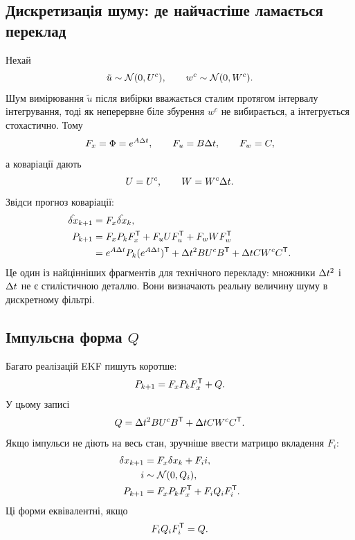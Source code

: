 \subsection{Дискретизація шуму: де найчастіше ламається переклад}

Нехай
\begin{equation}
 \tilde u \sim \mathcal{N}(0,U^c), \qquad w^c\sim\mathcal{N}(0,W^c).
\end{equation}
Шум вимірювання $\tilde u$ після вибірки вважається сталим протягом інтервалу інтегрування, тоді як неперервне біле збурення $w^c$ не вибирається, а інтегрується стохастично. Тому
\begin{equation}
 F_x = \Phi = e^{A\Delta t}, \qquad F_u = B\Delta t, \qquad F_w=C,
\end{equation}
а коваріації дають
\begin{equation}
 U = U^c, \qquad W=W^c\Delta t.
\end{equation}
Звідси прогноз коваріації:
\begin{align}
 \hat{\delta x}_{k+1} &= F_x\hat{\delta x}_{k},\\
 P_{k+1} &= F_xP_kF_x^{\mathsf T} + F_uUF_u^{\mathsf T} + F_wWF_w^{\mathsf T} \\
 &= e^{A\Delta t}P_k(e^{A\Delta t})^{\mathsf T} + \Delta t^2BU^cB^{\mathsf T} + \Delta t CW^cC^{\mathsf T}.
\end{align}
Це один із найцінніших фрагментів для технічного перекладу: множники $\Delta t^2$ і $\Delta t$ не є стилістичною деталлю. Вони визначають реальну величину шуму в дискретному фільтрі.

\subsection{Імпульсна форма $Q$}

Багато реалізацій EKF пишуть коротше:
\begin{equation}
 P_{k+1}=F_xP_kF_x^{\mathsf T}+Q.
\end{equation}
У цьому записі
\begin{equation}
 Q = \Delta t^2BU^cB^{\mathsf T} + \Delta t CW^cC^{\mathsf T}.
\end{equation}
Якщо імпульси не діють на весь стан, зручніше ввести матрицю вкладення $F_i$:
\begin{align}
 \delta x_{k+1} &= F_x\delta x_k + F_i i,\\
 i&\sim\mathcal{N}(0,Q_i),\\
 P_{k+1} &= F_xP_kF_x^{\mathsf T}+F_iQ_iF_i^{\mathsf T}.
\end{align}
Ці форми еквівалентні, якщо
\begin{equation}
 F_iQ_iF_i^{\mathsf T} = Q.
\end{equation}

